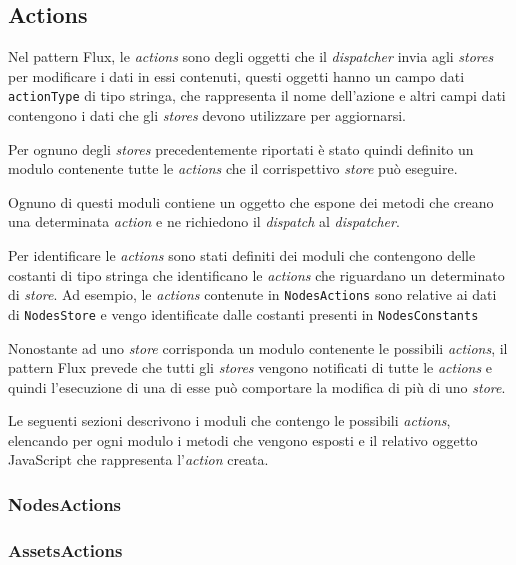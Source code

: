 \subsection{Actions}

Nel pattern Flux, le \textit{actions} sono degli oggetti che il \textit{dispatcher} invia agli \textit{stores} per modificare i dati in essi contenuti, questi oggetti hanno un campo dati \texttt{actionType} di tipo stringa, che rappresenta il nome dell'azione e altri campi dati contengono i dati che gli \textit{stores} devono utilizzare per aggiornarsi.

Per ognuno degli \textit{stores} precedentemente riportati è stato quindi definito un modulo contenente tutte le \textit{actions} che il corrispettivo \textit{store} può eseguire.

Ognuno di questi moduli contiene un oggetto che espone dei metodi che creano una determinata \textit{action} e ne richiedono il \textit{dispatch} al \textit{dispatcher}.

Per identificare le \textit{actions} sono stati definiti dei moduli che contengono delle costanti di tipo stringa che identificano le \textit{actions} che riguardano un determinato di \textit{store}. Ad esempio, le \textit{actions} contenute in \texttt{NodesActions} sono relative ai dati di \texttt{NodesStore} e vengo identificate dalle costanti presenti in \texttt{NodesConstants}

Nonostante ad uno \textit{store} corrisponda un modulo contenente le possibili \textit{actions}, il pattern Flux prevede che tutti gli \textit{stores} vengono notificati di tutte le \textit{actions} e quindi l'esecuzione di una di esse può comportare la modifica di più di uno \textit{store}.

Le seguenti sezioni descrivono i moduli che contengo le possibili \textit{actions}, elencando per ogni modulo i metodi che vengono esposti e il relativo oggetto JavaScript che rappresenta l'\textit{action} creata.


\subsubsection{NodesActions}


\subsubsection{AssetsActions}


